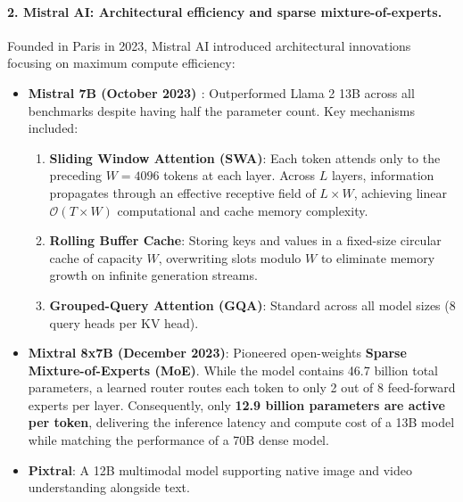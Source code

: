 \documentclass[../../main.tex]{subfiles}
\begin{document}
\paragraph{2. Mistral AI: Architectural efficiency and sparse mixture-of-experts.}
Founded in Paris in 2023, Mistral AI introduced architectural innovations focusing on maximum compute efficiency:
\begin{itemize}
    \item \textbf{Mistral 7B (October 2023) \cite{jiang2023mistral}}:
    Outperformed Llama 2 13B across all benchmarks despite having half the parameter count. Key mechanisms included:
    \begin{enumerate}
        \item \textbf{Sliding Window Attention (SWA)}: Each token attends only to the preceding $W = 4096$ tokens at each layer. Across $L$ layers, information propagates through an effective receptive field of $L \times W$, achieving linear $\mathcal{O}(T \times W)$ computational and cache memory complexity.
        \item \textbf{Rolling Buffer Cache}: Storing keys and values in a fixed-size circular cache of capacity $W$, overwriting slots modulo $W$ to eliminate memory growth on infinite generation streams.
        \item \textbf{Grouped-Query Attention (GQA)}: Standard across all model sizes (8 query heads per KV head).
    \end{enumerate}
    \item \textbf{Mixtral 8x7B (December 2023)}:
    Pioneered open-weights \textbf{Sparse Mixture-of-Experts (MoE)}. While the model contains 46.7 billion total parameters, a learned router routes each token to only 2 out of 8 feed-forward experts per layer. Consequently, only \textbf{12.9 billion parameters are active per token}, delivering the inference latency and compute cost of a 13B model while matching the performance of a 70B dense model.
    \item \textbf{Pixtral}: A 12B multimodal model supporting native image and video understanding alongside text.
\end{itemize}
\end{document}

